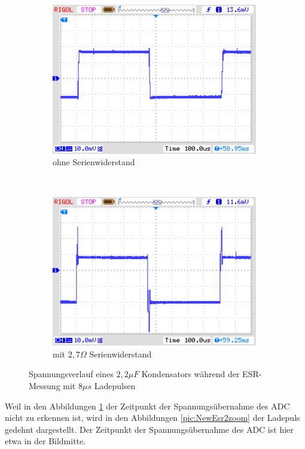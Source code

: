 \begin{figure}[H]
  \begin{subfigure}[b]{9cm}
    \centering
    \includegraphics[width=9cm]{../PNG/NewEsr2u2F0R0.png}
    \caption{ohne Serienwiderstand}
  \end{subfigure}
  ~
  \begin{subfigure}[b]{9cm}
    \centering
    \includegraphics[width=9cm]{../PNG/NewEsr2u2F2R7.png}
    \caption{mit \(2,7\Omega\) Serienwiderstand}
  \end{subfigure}
  \caption{Spannungsverlauf eines \(2,2\mu F\) Kondensators während der ESR-Messung mit \(8\mu s\) Ladepulsen}
  \label{pic:NewEsr2}
\end{figure}

Weil in den Abbildungen \ref{pic:NewEsr2} der Zeitpunkt der Spannungsübernahme des ADC nicht zu erkennen ist,
wird in den Abbildungen \ref{pic:NewEsr2zoom} der Ladepuls gedehnt dargestellt. Der Zeitpunkt der Spannungsübernahme
des ADC ist hier etwa in der Bildmitte.

